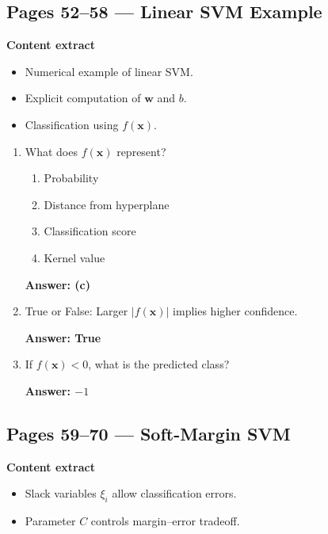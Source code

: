 \documentclass[12pt]{article}
\begin{document}
\subsection*{Pages 52--58 — Linear SVM Example}

\textbf{Content extract}
\begin{itemize}
	\item Numerical example of linear SVM.
	\item Explicit computation of $\mathbf{w}$ and $b$.
	\item Classification using $f(\mathbf{x})$.
\end{itemize}

\begin{enumerate}
	\item What does $f(\mathbf{x})$ represent?
	\begin{enumerate}
		\item Probability
		\item Distance from hyperplane
		\item Classification score
		\item Kernel value
	\end{enumerate}
	\textbf{Answer: (c)}
	
	\item True or False: Larger $|f(\mathbf{x})|$ implies higher confidence.
	
	\textbf{Answer: True}
	
	\item If $f(\mathbf{x})<0$, what is the predicted class?
	
	\textbf{Answer: $-1$}
\end{enumerate}


\subsection*{Pages 59--70 — Soft-Margin SVM}

\textbf{Content extract}
\begin{itemize}
	\item Slack variables $\xi_i$ allow classification errors.
	\item Parameter $C$ controls margin–error tradeoff.
\end{itemize}
\end{document}
